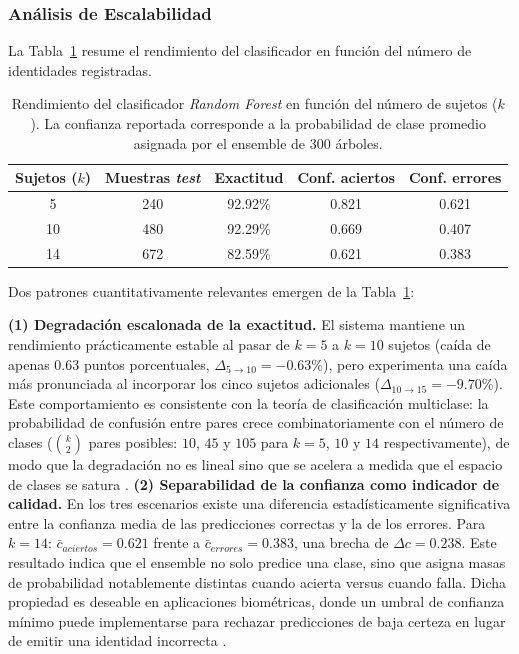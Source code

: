 \subsubsection{Análisis de Escalabilidad}

La Tabla~\ref{tab:escalabilidad} resume el rendimiento del clasificador en función del número de identidades registradas.
\begin{table}[h!]
	\centering
	\caption[Rendimiento del \textit{Random Forest} según el número de sujetos ($k$).]{Rendimiento del clasificador \textit{Random Forest} en función del número de sujetos ($k$).
		La confianza reportada corresponde a la probabilidad de clase promedio asignada por el ensemble de 300 árboles.}
	\label{tab:escalabilidad}
	\vspace{0.2cm}
	\begin{tabular}{ccccc}
		\toprule
		\textbf{Sujetos ($k$)} & \textbf{Muestras \textit{test}} & \textbf{Exactitud} & \textbf{Conf.
			aciertos} & \textbf{Conf. errores} \\
		\midrule
		5  & 240 & 92.92\% & 0.821 & 0.621 \\
		10 & 480 & 92.29\% & 0.669 & 0.407 \\
		14 & 672 & 82.59\% & 0.621 & 0.383 \\
		\bottomrule
	\end{tabular}
\end{table}

Dos patrones cuantitativamente relevantes emergen de la Tabla~\ref{tab:escalabilidad}:

\textbf{(1) Degradación escalonada de la exactitud.} El sistema mantiene un rendimiento prácticamente estable al pasar de $k=5$ a $k=10$ sujetos (caída de apenas $0.63$ puntos porcentuales, $\Delta_{5\to10} = -0.63\%$), pero experimenta una caída más pronunciada al incorporar los cinco sujetos adicionales ($\Delta_{10\to15} = -9.70\%$).
Este comportamiento es consistente con la teoría de clasificación multiclase: la probabilidad de confusión entre pares crece combinatoriamente con el número de clases ($\binom{k}{2}$ pares posibles: $10$, $45$ y $105$ para $k=5$, $10$ y $14$ respectivamente), de modo que la degradación no es lineal sino que se acelera a medida que el espacio de clases se satura \cite{komogortsev2010}.
\textbf{(2) Separabilidad de la confianza como indicador de calidad.} En los tres escenarios existe una diferencia estadísticamente significativa entre la confianza media de las predicciones correctas y la de los errores.
Para $k=14$: $\bar{c}_{aciertos} = 0.621$ frente a $\bar{c}_{errores} = 0.383$, una brecha de $\Delta c = 0.238$.
Este resultado indica que el ensemble no solo predice una clase, sino que asigna masas de probabilidad notablemente distintas cuando acierta versus cuando falla.
Dicha propiedad es deseable en aplicaciones biométricas, donde un umbral de confianza mínimo puede implementarse para rechazar predicciones de baja certeza en lugar de emitir una identidad incorrecta \cite{duchowski2017}.
